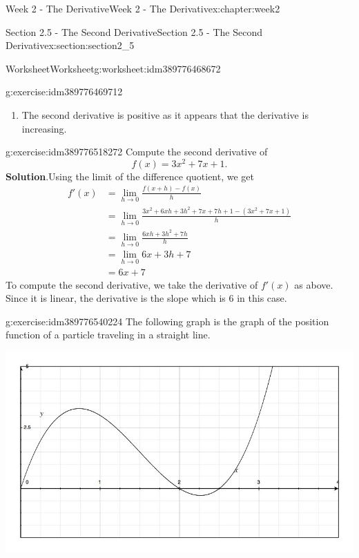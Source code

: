 \documentclass[oneside,10pt,]{book}
\newcommand{\blocktitlefont}{\relax}
\numberwithin{equation}{section}
\newcommand{\amp}{&}
\begin{document}
\begin{chapterptx}{Week 2 - The Derivative}{}{Week 2 - The Derivative}{}{}{x:chapter:week2}
\begin{sectionptx}{Section 2.5 - The Second Derivative}{}{Section 2.5 - The Second Derivative}{}{}{x:section:section2_5}
\begin{worksheet-subsection}{Worksheet}{}{Worksheet}{}{}{g:worksheet:idm389776468672}
\begin{divisionexercise}{1}{}{}{g:exercise:idm389776469712}
\begin{enumerate}[label=(\alph*)]
\begin{equation*}
\begin{array}{| p{2.5cm} | p{2cm} | p{2cm} | p{2cm} | p{2cm} | p{2cm} |}
\hline \text{Time Interval} & 0-2 & 2-4 & 4-6 & 6-8 & 8-10\\
\hline \frac{ds}{dt} &  \frac{20-0}{2-0} = 10 & 16  & 19 & 21 & 34 \\
\hline
\end{array} 
\end{equation*}
%
\item{}The second derivative is positive as it appears that the derivative is increasing.%
\end{enumerate}
\end{divisionexercise}%
\begin{divisionexercise}{2}{}{}{g:exercise:idm389776518272}%
Compute the second derivative of%
\begin{equation*}
f(x) = 3x^2+7x+1 . 
\end{equation*}
%
\textbf{\blocktitlefont Solution}.\hypertarget{g:solution:idm389776522304}{}\quad{}Using the limit of the difference quotient, we get%
\begin{align*}
f'(x)  \amp = \lim_{h\to 0} \frac{f(x+h)-f(x)}{h} \\
\amp = \lim_{h\to 0} \frac{3x^2+6xh+3h^2+7x+7h+1 - (3x^2+7x+1)}{h} \\
\amp = \lim_{h\to 0} \frac{6xh+3h^2+7h}{h} \\
\amp = \lim_{h\to 0} 6x+3h+7\\
\amp = 6x+7
\end{align*}
To compute the second derivative, we take the derivative of \(f'(x)\) as above. Since it is linear, the derivative is the slope which is 6 in this case.%
\end{divisionexercise}%
\begin{divisionexercise}{3}{}{}{g:exercise:idm389776540224}%
\footnotemark{}The following graph is the graph of the position function of a particle traveling in a straight line.%
\par
\begin{image}{0}{1}{0}%
\includegraphics[width=\linewidth]{images/Math140S13wksht5g1.jpg}

\end{image}
\end{divisionexercise}
\end{worksheet-subsection}
\end{sectionptx}
\end{chapterptx}
\end{document}
